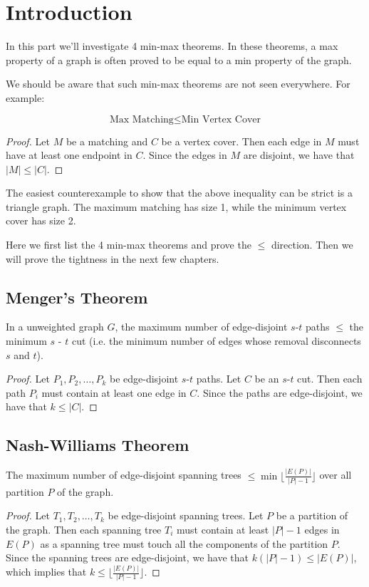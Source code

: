 \chapter{Introduction}

In this part we'll investigate 4 min-max theorems. In these theorems, a max property of a graph is often proved to be equal to a min property of the graph.

We should be aware that such min-max theorems are not seen everywhere. For example:

\begin{claim}
	\[\text{Max Matching} \leq \text{Min Vertex Cover}\]
\end{claim}
\begin{proof}
	Let $M$ be a matching and $C$ be a vertex cover. Then each edge in $M$ must have at least one endpoint in $C$. Since the edges in $M$ are disjoint, we have that $|M| \leq |C|$.
\end{proof}

The easiest counterexample to show that the above inequality can be strict is a triangle graph. The maximum matching has size 1, while the minimum vertex cover has size 2.

Here we first list the 4 min-max theorems and prove the $\leq$ direction. Then we will prove the tightness in the next few chapters.

\section{Menger's Theorem}

\begin{claim}
	In a unweighted graph $G$, the maximum number of edge-disjoint $s$-$t$ paths $\le$ the minimum $s$ - $t$ cut (i.e. the minimum number of edges whose removal disconnects $s$ and $t$).
\end{claim}
\begin{proof}
	Let $P_1, P_2, \ldots, P_k$ be edge-disjoint $s$-$t$ paths. Let $C$ be an $s$-$t$ cut. Then each path $P_i$ must contain at least one edge in $C$. Since the paths are edge-disjoint, we have that $k \leq |C|$.
\end{proof}

\section{Nash-Williams Theorem}

\begin{claim}
	The maximum number of edge-disjoint spanning trees $\le \min \lfloor \frac{|E(P)|}{|P|-1} \rfloor$ over all partition $P$ of the graph.
\end{claim}
\begin{proof}
	Let $T_1, T_2, \ldots, T_k$ be edge-disjoint spanning trees. Let $P$ be a partition of the graph. Then each spanning tree $T_i$ must contain at least $|P|-1$ edges in $E(P)$ as a spanning tree must touch all the components of the partition $P$. Since the spanning trees are edge-disjoint, we have that $k(|P|-1) \leq |E(P)|$, which implies that $k \leq \lfloor \frac{|E(P)|}{|P|-1} \rfloor$.
\end{proof}


